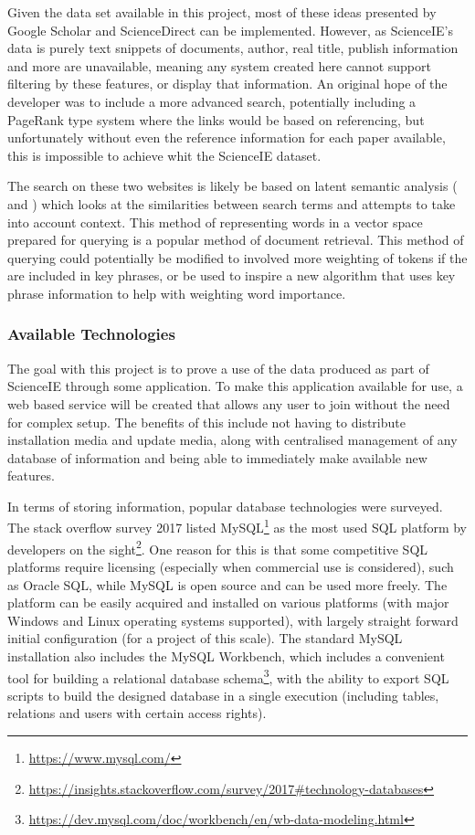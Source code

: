Given the data set available in this project, most of these ideas presented by Google Scholar and ScienceDirect can be implemented. However, as ScienceIE's data is purely text snippets of documents, author, real title, publish information and more are unavailable, meaning any system created here cannot support filtering by these features, or display that information. An original hope of the developer was to include a more advanced search, potentially including a PageRank type system \cite{Page1998} where the links would be based on referencing, but unfortunately without even the reference information for each paper available, this is impossible to achieve whit the ScienceIE dataset.

The search on these two websites is likely be based on latent semantic analysis (\cite{Landauer1998} and \cite{AswaniKumar2012}) which looks at the similarities between search terms and attempts to take into account context. This method of representing words in a vector space prepared for querying is a popular method of document retrieval. This method of querying could potentially be modified to involved more weighting of tokens if the are included in key phrases, or be used to inspire a new algorithm that uses key phrase information to help with weighting word importance.

\subsubsection*{Available Technologies}
The goal with this project is to prove a use of the data produced as part of ScienceIE through some application. To make this application available for use, a web based service will be created that allows any user to join without the need for complex setup. The benefits of this include not having to distribute installation media and update media, along with centralised management of any database of information and being able to immediately make available new features.

In terms of storing information, popular database technologies were surveyed. The stack overflow survey 2017 listed MySQL\footnote{\href{https://www.mysql.com/}{https://www.mysql.com/}} as the most used SQL platform by developers on the sight\footnote{\href{https://insights.stackoverflow.com/survey/2017\#technology-databases}{https://insights.stackoverflow.com/survey/2017\#technology-databases}}. One reason for this is that some competitive SQL platforms require licensing (especially when commercial use is considered), such as Oracle SQL, while MySQL is open source and can be used more freely. The platform can be easily acquired and installed on various platforms (with major Windows and Linux operating systems supported), with largely straight forward initial configuration (for a project of this scale). The standard MySQL installation also includes the MySQL Workbench, which includes a convenient tool for building a relational database schema\footnote{\href{https://dev.mysql.com/doc/workbench/en/wb-data-modeling.html}{https://dev.mysql.com/doc/workbench/en/wb-data-modeling.html}}, with the ability to export SQL scripts to build the designed database in a single execution (including tables, relations and users with certain access rights). 


